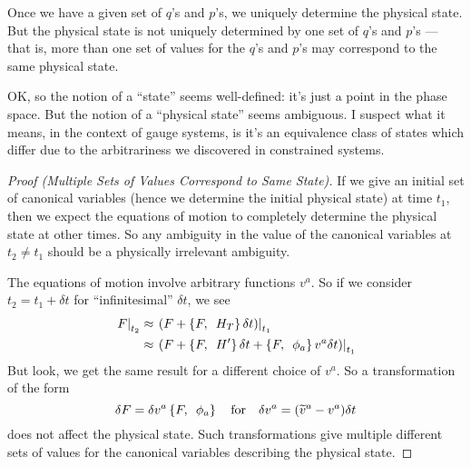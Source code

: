 Once we have a given set of $q$'s and $p$'s, we uniquely determine the
physical state. But the physical state is not uniquely determined by one
set of $q$'s and $p$'s --- that is, more than one set of values for the
$q$'s and $p$'s may correspond to the same physical state.

\begin{rmk}
OK, so the notion of a ``state'' seems well-defined: it's just a point
in the phase space. But the notion of a ``physical state'' seems
ambiguous. I suspect what it means, in the context of gauge systems, is
it's an equivalence class of states which differ due to the
arbitrariness we discovered in constrained systems.
\end{rmk}

\begin{proof}[Proof (Multiple Sets of Values Correspond to Same State)]
If we give an initial set of canonical variables (hence we determine the
initial physical state) at time $t_{1}$, then we expect the equations of
motion to completely determine the physical state at other times. So any
ambiguity in the value of the canonical variables at $t_{2}\neq t_{1}$
should be a physically irrelevant ambiguity.

The equations of motion 
involve arbitrary functions $v^{a}$. So if we consider
$t_{2}=t_{1}+\delta t$ for ``infinitesimal'' $\delta t$, we see
\begin{equation}
\begin{split}
\left.F\right|_{t_{2}}
&\approx\left.\left(F + \left\{F,\enspace H_{T}\right\}\delta t\right)\right|_{t_{1}}\\
&\approx\left.\left(F + \left\{F,\enspace H'\right\}\delta t + \left\{F,\enspace\phi_{a}\right\}v^{a}\delta{t}\right)\right|_{t_{1}}
\end{split}
\end{equation}
But look, we get the same result for a different choice of $v^{a}$. So a
transformation of the form
\begin{equation}
\delta F = \delta v^{a}\left\{F,\enspace\phi_{a}\right\}\quad\mbox{for}\quad
\delta v^{a} = (\widetilde{v}^{a}-v^{a})\delta t
\end{equation}
does not affect the physical state. Such transformations give multiple
different sets of values for the canonical variables describing the
physical state.
\end{proof}

